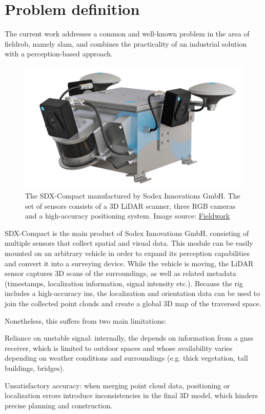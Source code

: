 \section{Problem definition}

The current work addresses a common and well-known problem in the area of \gls{fieldrob}, namely \acrfull{slam}, and combines the practicality of an industrial solution with a perception-based approach.

\begin{figure}
    \centering
    \includegraphics[width=0.6\linewidth]{images/sdx-compact.jpg}
    \caption[SDX-Compact]{The SDX-Compact manufactured by Sodex Innovations GmbH. The set of sensors consists of a 3D LiDAR scanner, three RGB cameras and a high-accuracy positioning system. Image source: \href{https://fieldwork.ch/de/produkte/geopositioning/mobile-datenerfassung/sdx-compact}{Fieldwork}}
    \label{fig:sdx-compact}
\end{figure}

SDX-Compact  is the main product of Sodex Innovations GmbH, consisting of multiple sensors that collect spatial and visual data. This module can be easily mounted on an arbitrary vehicle in order to expand its perception capabilities and convert it into a \gls{surveying} device. While the vehicle is moving, the LiDAR sensor captures 3D scans of the surroundings, as well as related metadata (timestamps, localization information, signal intensity etc.). Because the rig includes a high-accuracy \acrfull{ins}, the localization and orientation data can be used to join the collected point clouds and create a global 3D map of the traversed space.

Nonetheless, this suffers from two main limitations:

\begin{compactitem}
    \item Reliance on unstable signal: internally, the  depends on information from a \acrfull{gnss} receiver, which is limited to outdoor spaces and whose availability varies depending on weather conditions and surroundings (e.g. thick vegetation, tall buildings, bridges). 
    \item Unsatisfactory accuracy: when merging point cloud data, positioning or localization errors introduce inconsistencies in the final 3D model, which hinders precise planning and construction.
\end{compactitem}

